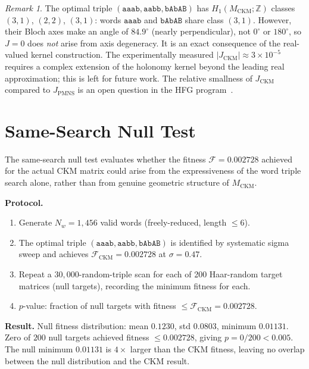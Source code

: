 \documentclass[11pt,a4paper]{article}
\theoremstyle{remark}
\newtheorem{remark}[theorem]{Remark}
\newcommand{\MCKM}{M_{\mathrm{CKM}}}
\newcommand{\ZZ}{\mathbb{Z}}
\begin{document}
\begin{remark}
The optimal triple $(\mathtt{aaab}, \mathtt{aabb}, \mathtt{bAbAB})$
has $H_1(\MCKM;\ZZ)$ classes $(3,1)$, $(2,2)$, $(3,1)$:
words $\mathtt{aaab}$ and $\mathtt{bAbAB}$ share class $(3,1)$.
However, their Bloch axes make an angle of $84.9^\circ$ (nearly perpendicular),
not $0^\circ$ or $180^\circ$, so $J = 0$ does \emph{not} arise from axis
degeneracy. It is an exact consequence of the real-valued kernel construction.
The experimentally measured $|J_\mathrm{CKM}| \approx 3 \times 10^{-5}$
requires a complex extension of the holonomy kernel beyond the
leading real approximation; this is left for future work.
The relative smallness of $J_\mathrm{CKM}$ compared to $J_\mathrm{PMNS}$
is an open question in the HFG program~\cite{Gentry:arith}.
\end{remark}

\section{Same-Search Null Test}
\label{sec:null}

The same-search null test evaluates whether the fitness
$\mathcal{F} = 0.002728$ achieved for the actual CKM matrix could
arise from the expressiveness of the word triple search alone,
rather than from genuine geometric structure of $\MCKM$.

\textbf{Protocol.}
\begin{enumerate}[(1)]
\item Generate $N_w = 1{,}456$ valid words (freely-reduced, length $\leq 6$).
\item The optimal triple $(\mathtt{aaab}, \mathtt{aabb}, \mathtt{bAbAB})$
  is identified by systematic sigma sweep and achieves
  $\mathcal{F}_\mathrm{CKM} = 0.002728$ at $\sigma = 0.47$.
\item Repeat a $30{,}000$-random-triple scan for each of 200 Haar-random
  target matrices (null targets), recording the minimum fitness for each.
\item $p$-value: fraction of null targets with fitness
  $\leq \mathcal{F}_\mathrm{CKM} = 0.002728$.
\end{enumerate}

\textbf{Result.}
Null fitness distribution: mean $0.1230$, std $0.0803$, minimum $0.01131$.
Zero of $200$ null targets achieved fitness $\leq 0.002728$,
giving \emph{$p = 0/200 < 0.005$}.
The null minimum $0.01131$ is $4\times$ larger than the CKM fitness,
leaving no overlap between the null distribution and the CKM result.
\end{document}
